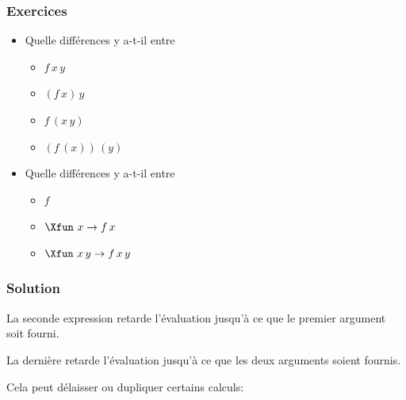 %
\begin{frame}
\frametitle{Exercices}

\begin{itemize}

  \item Quelle différences y a-t-il entre

  \begin{itemize}

    \item $f \, x \, y$

    \item $(f \, x) \, y$

    \item $f \, (x \, y)$

    \item $(f \, (x)) \, (y)$

  \end{itemize}

  \item Quelle différences y a-t-il entre
  \begin{itemize}

    \item $f$

    \item $\Xfun \,\, x \rightarrow f \, x$

    \item $\Xfun \,\, x \, y \rightarrow f \, x \, y$

  \end{itemize}

\end{itemize}

\end{frame}

%
\begin{frame}
\frametitle{Solution}

La seconde expression retarde l'évaluation jusqu'à ce que le premier
argument soit fourni.

\bigskip

La dernière retarde l'évaluation jusqu'à ce que les deux arguments
soient fournis.

\bigskip

Cela peut délaisser ou dupliquer certains calculs:

\bigskip







\end{frame}

